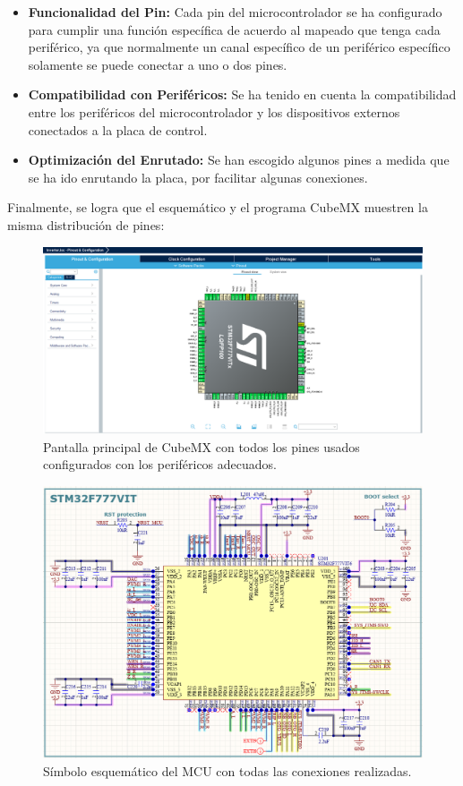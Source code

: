 \begin{itemize}
	\item \textbf{Funcionalidad del Pin:} Cada pin del microcontrolador se ha configurado para cumplir una función específica de acuerdo al mapeado que tenga cada periférico, ya que normalmente un canal específico de un periférico específico solamente se puede conectar a uno o dos pines.
	
	\item \textbf{Compatibilidad con Periféricos:} Se ha tenido en cuenta la compatibilidad entre los periféricos del microcontrolador y los dispositivos externos conectados a la placa de control.
	
	\item \textbf{Optimización del Enrutado:} Se han escogido algunos pines a medida que se ha ido enrutando la placa, por facilitar algunas conexiones.
	
\end{itemize}

Finalmente, se logra que el esquemático y el programa CubeMX muestren la misma distribución de pines:

\begin{figure}[H]
	\centering
	\includegraphics[width=0.7\linewidth]{fig/cubeMX}
	\caption{Pantalla principal de CubeMX con todos los pines usados configurados con los periféricos adecuados.}
\end{figure}

\begin{figure}[H]
	\centering
	\includegraphics[width=0.7\linewidth]{fig/schMCU}
	\caption{Símbolo esquemático del MCU con todas las conexiones realizadas.}
\end{figure}

